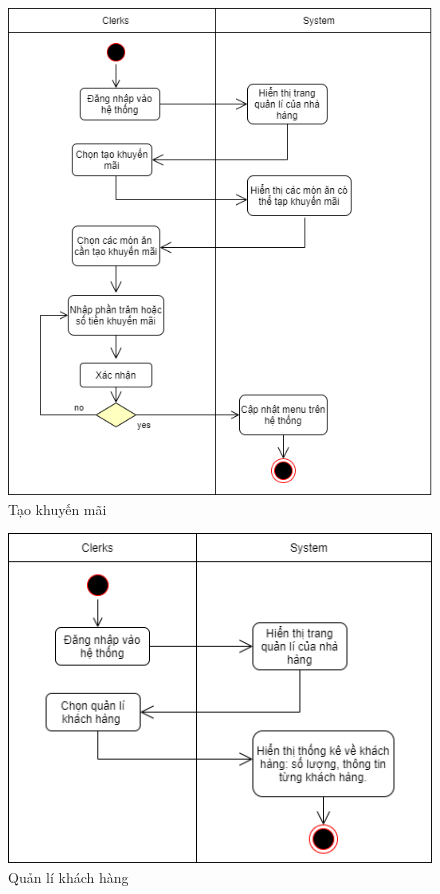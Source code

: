 \begin{figure}[!h]
    \begin{center}
        \includegraphics[scale=0.5]{Images/ActivityDiagram/AD_promotion.png}
    \end{center}
    \hspace{0.3cm}
    \caption{Tạo khuyến mãi}
\end{figure}
\begin{figure}[!h]
    \begin{center}
        \includegraphics[scale=0.4]{Images/ActivityDiagram/AD_customers.png}
    \end{center}
    \hspace{0.3cm}
    \caption{Quản lí khách hàng}
\end{figure}
